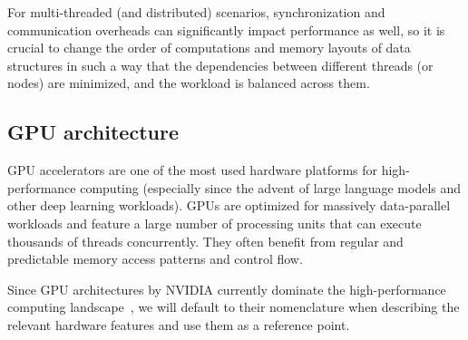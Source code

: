 

For multi-threaded (and distributed) scenarios, synchronization and communication overheads can significantly impact performance as well, so it is crucial to change the order of computations and memory layouts of data structures in such a way that the dependencies between different threads (or nodes) are minimized, and the workload is balanced across them.


\subsection{GPU architecture}\label{sec:gpu-architecture}

GPU accelerators are one of the most used hardware platforms for high-performance computing (especially since the advent of large language models and other deep learning workloads). GPUs are optimized for massively data-parallel workloads and feature a large number of processing units that can execute thousands of threads concurrently. They often benefit from regular and predictable memory access patterns and control flow.

Since GPU architectures by NVIDIA currently dominate the high-performance computing landscape~\cite{top500}, we will default to their nomenclature when describing the relevant hardware features and use them as a reference point.

